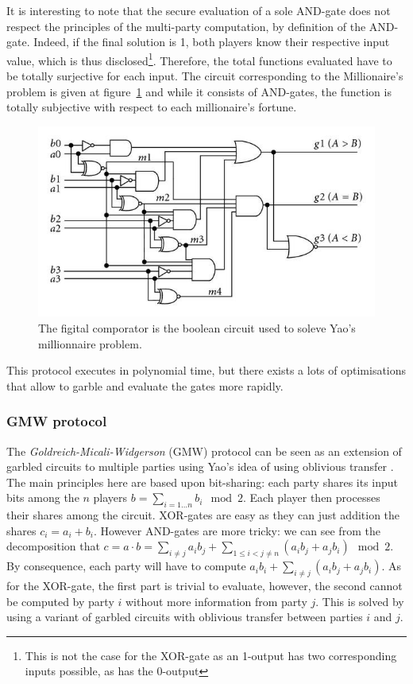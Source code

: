 It is interesting to note that the secure evaluation of a sole AND-gate does not respect the principles of the multi-party computation, by definition of the AND-gate. Indeed, if the final solution is 1, both players know their respective input value, which is thus disclosed\footnote{This is not the case for the XOR-gate as an 1-output has two corresponding inputs possible, as has the 0-output}. Therefore, the total functions evaluated have to be totally surjective for each input. The circuit corresponding to the Millionaire's problem is given at figure~\ref{c2:yao-comp} and while it consists of AND-gates, the function is totally subjective with respect to each millionaire's fortune.

\begin{figure}[ht!]
    \centering
    \includegraphics[width=.7\textwidth]{parts/chap-3/img/yao-comp.jpg}
    \caption{The figital comporator is the boolean circuit used to soleve Yao's millionnaire problem.} 
    \label{c2:yao-comp}
\end{figure}

This protocol executes in polynomial time, but there exists a lots of optimisations that allow to garble and evaluate the gates more rapidly.

\subsubsection{GMW protocol}
The \emph{Goldreich-Micali-Widgerson} (GMW) protocol can be seen as an extension of garbled circuits to multiple parties using Yao's idea of using oblivious transfer \cite{Goldreich1987HowGame}. The main principles here are based upon bit-sharing: each party shares its input bits among the $n$ players $b = \sum_{i=1\ldots n}b_i \mod 2$. Each player then processes their shares among the circuit. XOR-gates are easy as they can just addition the shares $c_i = a_i + b_i$. However AND-gates are more tricky: we can see from the decomposition that $c = a \cdot b = \sum_{i\neq j}a_ib_j+\sum_{1\leq i< j\neq n}\left(a_ib_j + a_jb_i \right) \mod 2$. By consequence, each party will have to compute $a_ib_i+ \sum_{i\neq j}\left( a_ib_j + a_jb_i\right)$. As for the XOR-gate, the first part is trivial to evaluate, however, the second cannot be computed by party $i$ without more information from party $j$. This is solved by using a variant of garbled circuits with oblivious transfer between parties $i$ and $j$.

